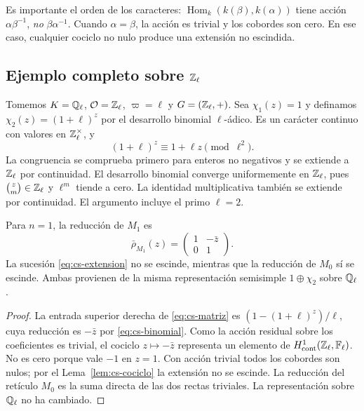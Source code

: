 Es importante el orden de los caracteres:
$\operatorname{Hom}_k(k(\beta),k(\alpha))$ tiene acción
$\alpha\beta^{-1}$, \emph{no} $\beta\alpha^{-1}$.
Cuando $\alpha=\beta$, la acción es trivial y los
cobordes son cero. En ese caso, cualquier cociclo no nulo
produce una extensión no escindida.

\subsection{Ejemplo completo sobre \texorpdfstring{$\mathbb{Z}_\ell$}{Z-ell}}

Tomemos $K=\mathbb{Q}_\ell$, $\mathcal O=\mathbb{Z}_\ell$,
$\varpi=\ell$ y $G=(\mathbb{Z}_\ell,+)$.
Sea $\chi_1(z)=1$ y definamos
$\chi_2(z)=(1+\ell)^z$ por el desarrollo binomial
$\ell$-ádico. Es un carácter continuo con valores en
$\mathbb{Z}_\ell^\times$, y
\begin{equation}
 (1+\ell)^z\equiv1+\ell z\pmod{\ell^2}.
 \label{eq:cs-binomial}
\end{equation}
La congruencia se comprueba primero para enteros
no negativos y se extiende a $\mathbb{Z}_\ell$ por continuidad.
El desarrollo binomial converge uniformemente en $\mathbb{Z}_\ell$,
pues $\binom{z}{m}\in\mathbb{Z}_\ell$ y $\ell^m$ tiende a cero.
La identidad multiplicativa también se extiende por continuidad.
El argumento incluye el primo $\ell=2$.

\begin{proposicion}
\label{prop:cs-Zell}
Para $n=1$, la reducción de $M_1$ es
\begin{equation}
 \bar\rho_{M_1}(z)
 =\begin{pmatrix}1&-\bar z\\0&1\end{pmatrix}.
 \label{eq:cs-unipotente}
\end{equation}
La sucesión \eqref{eq:cs-extension} no se escinde,
mientras que la reducción de $M_0$ sí se escinde.
Ambas provienen de la misma representación semisimple
$1\oplus\chi_2$ sobre $\mathbb{Q}_\ell$.
\end{proposicion}

\begin{proof}
La entrada superior derecha de \eqref{eq:cs-matriz}
es $(1-(1+\ell)^z)/\ell$, cuya reducción es $-\bar z$
por \eqref{eq:cs-binomial}. Como la acción residual
sobre los coeficientes es trivial, el cociclo $z\mapsto-\bar z$
representa un elemento de
$H^1_{\mathrm{cont}}(\mathbb{Z}_\ell,\mathbb F_\ell)$.
No es cero porque vale $-1$ en $z=1$.
Con acción trivial todos los cobordes son nulos; por el
Lema~\ref{lem:cs-cociclo} la extensión no se escinde.
La reducción del retículo $M_0$ es la suma directa
de las dos rectas triviales. La representación sobre
$\mathbb{Q}_\ell$ no ha cambiado.
\end{proof}

